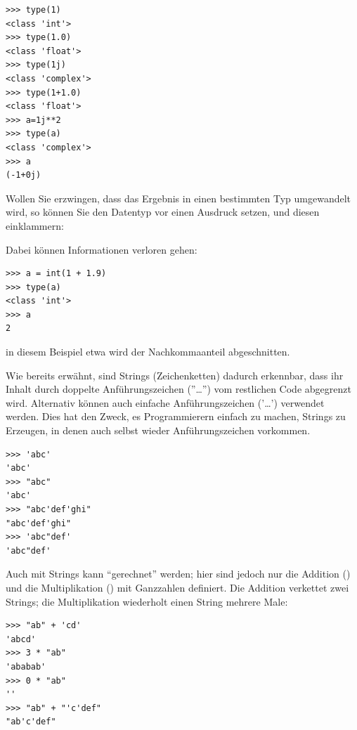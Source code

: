 \begin{cmdbox}
\begin{verbatim}
>>> type(1)
<class 'int'>
>>> type(1.0)
<class 'float'>
>>> type(1j)
<class 'complex'>
>>> type(1+1.0)
<class 'float'>
>>> a=1j**2
>>> type(a)
<class 'complex'>
>>> a
(-1+0j)
\end{verbatim}
\end{cmdbox}

Wollen Sie erzwingen, dass das Ergebnis in einen bestimmten Typ umgewandelt wird, so können Sie den Datentyp vor einen Ausdruck setzen, und diesen einklammern:
\begin{center}
\end{center}

Dabei können Informationen verloren gehen:
\begin{cmdbox}
\begin{verbatim}
>>> a = int(1 + 1.9)
>>> type(a)
<class 'int'>
>>> a
2
\end{verbatim}
\end{cmdbox}
in diesem Beispiel etwa wird der Nachkommaanteil abgeschnitten.

Wie bereits erwähnt, sind Strings (Zeichenketten) dadurch erkennbar, dass ihr Inhalt durch doppelte Anführungszeichen (''\ldots'') vom restlichen Code abgegrenzt wird. Alternativ können auch einfache Anführungszeichen ('\ldots') verwendet werden. Dies hat den Zweck, es Programmierern einfach zu machen, Strings zu Erzeugen, in denen auch selbst wieder Anführungszeichen vorkommen.

\begin{cmdbox}
\begin{verbatim}
>>> 'abc'
'abc'
>>> "abc"
'abc'
>>> "abc'def'ghi"
"abc'def'ghi"
>>> 'abc"def'
'abc"def'
\end{verbatim}
\end{cmdbox}

Auch mit Strings kann \enquote{gerechnet} werden; hier sind jedoch nur die Addition (\inPy{+}) und die Multiplikation (\inPy{*}) mit Ganzzahlen definiert. Die Addition verkettet zwei Strings; die Multiplikation wiederholt einen String mehrere Male:

\begin{cmdbox}
\begin{verbatim}
>>> "ab" + 'cd'
'abcd'
>>> 3 * "ab"
'ababab'
>>> 0 * "ab"
''
>>> "ab" + "'c'def"
"ab'c'def"
\end{verbatim}
\end{cmdbox}

